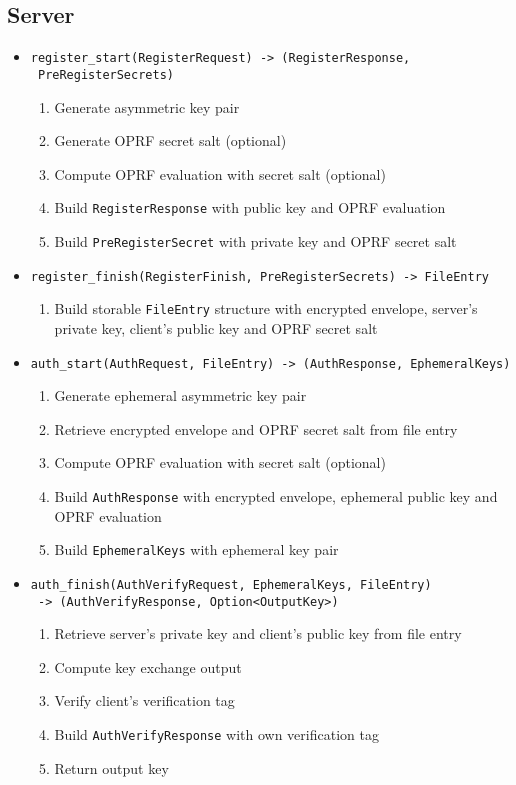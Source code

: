 ﻿\documentclass[../report.tex]{subfiles}
\begin{document}
\subsection{Server}
\begin{itemize}
 \item \verb|register_start(RegisterRequest) -> (RegisterResponse,|\\
       \verb| PreRegisterSecrets)|
  \begin{enumerate}
    \item Generate asymmetric key pair
    \item Generate OPRF secret salt (optional)
    \item Compute OPRF evaluation with secret salt (optional)
    \item Build \verb|RegisterResponse| with public key and OPRF evaluation
    \item Build \verb|PreRegisterSecret| with private key and OPRF secret salt
  \end{enumerate}
  
 \item \verb|register_finish(RegisterFinish, PreRegisterSecrets) -> FileEntry|
  \begin{enumerate}
    \item Build storable \verb|FileEntry| structure with encrypted envelope, server's private key, client's public key and OPRF secret salt
  \end{enumerate}
  
  
  
 \item \verb|auth_start(AuthRequest, FileEntry) -> (AuthResponse, EphemeralKeys)|
  \begin{enumerate}
    \item Generate ephemeral asymmetric key pair
    \item Retrieve encrypted envelope and OPRF secret salt from file entry
    \item Compute OPRF evaluation with secret salt (optional)
    \item Build \verb|AuthResponse| with encrypted envelope, ephemeral public key and OPRF evaluation
    \item Build \verb|EphemeralKeys| with ephemeral key pair
  \end{enumerate}
  
 \item \verb|auth_finish(AuthVerifyRequest, EphemeralKeys, FileEntry)|\\ 
       \verb| -> (AuthVerifyResponse, Option<OutputKey>)|
  \begin{enumerate}
    \item Retrieve server's private key and client's public key from file entry
    \item Compute key exchange output
    \item Verify client's verification tag
    \item Build \verb|AuthVerifyResponse| with own verification tag
    \item Return output key
  \end{enumerate}
  
\end{itemize}
\end{document}
